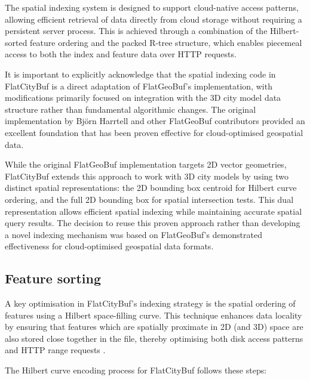 The spatial indexing system is designed to support cloud-native access patterns, allowing efficient retrieval of data directly from cloud storage without requiring a persistent server process. This is achieved through a combination of the Hilbert-sorted feature ordering and the packed R-tree structure, which enables piecemeal access to both the index and feature data over HTTP requests.

It is important to explicitly acknowledge that the spatial indexing code in FlatCityBuf is a direct adaptation of FlatGeoBuf's implementation, with modifications primarily focused on integration with the 3D city model data structure rather than fundamental algorithmic changes. The original implementation by Björn Harrtell and other FlatGeoBuf contributors \citep{flatgeobuf} provided an excellent foundation that has been proven effective for cloud-optimised geospatial data.

While the original FlatGeoBuf implementation targets 2D vector geometries, FlatCityBuf extends this approach to work with 3D city models by using two distinct spatial representations: the 2D bounding box centroid for Hilbert curve ordering, and the full 2D bounding box for spatial intersection tests. This dual representation allows efficient spatial indexing while maintaining accurate spatial query results. The decision to reuse this proven approach rather than developing a novel indexing mechanism was based on FlatGeoBuf's demonstrated effectiveness for cloud-optimised geospatial data formats.

\subsection{Feature sorting}
\label{methodology:spatial_index:feature_sorting}

A key optimisation in FlatCityBuf's indexing strategy is the spatial ordering of features using a Hilbert space-filling curve. This technique enhances data locality by ensuring that features which are spatially proximate in 2D (and 3D) space are also stored close together in the file, thereby optimising both disk access patterns and HTTP range requests \citep{horance_2022_detail}.

The Hilbert curve encoding process for FlatCityBuf follows these steps:

